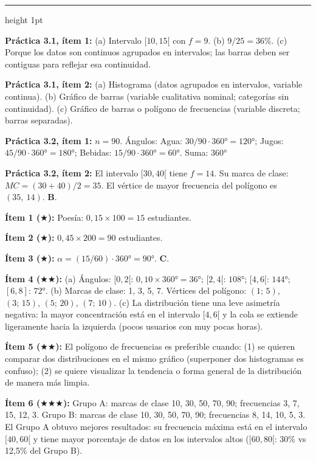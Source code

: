 \documentclass[11pt, letterpaper]{article}
\newcommand{\subbloque}[1]{%
  \vspace{14pt}
  \noindent{\large\bfseries\color{zenitnavy} #1}\par
  \vspace{4pt}\hrule height 1pt\vspace{8pt}}
\begin{document}
\subbloque{Sección 3 --- Gráficos estadísticos}

\textbf{Práctica 3.1, ítem 1:}
(a) Intervalo $[10,15[$ con $f=9$.
(b) $9/25=36\%$.
(c) Porque los datos son continuos agrupados en intervalos; las barras deben ser contiguas para reflejar esa continuidad.

\textbf{Práctica 3.1, ítem 2:}
(a) Histograma (datos agrupados en intervalos, variable continua).
(b) Gráfico de barras (variable cualitativa nominal; categorías sin continuidad).
(c) Gráfico de barras o polígono de frecuencias (variable discreta; barras separadas).

\textbf{Práctica 3.2, ítem 1:}
$n=90$. Ángulos: Agua: $30/90 \cdot 360°=120°$; Jugos: $45/90 \cdot 360°=180°$; Bebidas: $15/90 \cdot 360°=60°$. Suma: $360°$ \checkmark

\textbf{Práctica 3.2, ítem 2:}
El intervalo $[30,40[$ tiene $f=14$. Su marca de clase: $MC=(30+40)/2=35$. El vértice de mayor frecuencia del polígono es $(35,\ 14)$. \textbf{B}.

\textbf{Ítem 1 ($\bigstar$):} Poesía: $0{,}15\times100=15$ estudiantes.

\textbf{Ítem 2 ($\bigstar$):} $0{,}45\times200=90$ estudiantes.

\textbf{Ítem 3 ($\bigstar$):} $\alpha = (15/60)\cdot360°=90°$. \textbf{C}.

\textbf{Ítem 4 ($\bigstar\bigstar$):}
(a) Ángulos: $[0,2[$: $0{,}10\times360°=36°$; $[2,4[$: $108°$; $[4,6[$: $144°$; $[6,8]$: $72°$.
(b) Marcas de clase: 1, 3, 5, 7. Vértices del polígono: $(1;\,5)$, $(3;\,15)$, $(5;\,20)$, $(7;\,10)$.
(c) La distribución tiene una leve asimetría negativa: la mayor concentración está en el intervalo $[4,6[$ y la cola se extiende ligeramente hacia la izquierda (pocos usuarios con muy pocas horas).

\textbf{Ítem 5 ($\bigstar\bigstar$):} El polígono de frecuencias es preferible cuando: (1) se quieren comparar dos distribuciones en el mismo gráfico (superponer dos histogramas es confuso); (2) se quiere visualizar la tendencia o forma general de la distribución de manera más limpia.

\textbf{Ítem 6 ($\bigstar\bigstar\bigstar$):}
Grupo A: marcas de clase 10, 30, 50, 70, 90; frecuencias 3, 7, 15, 12, 3.
Grupo B: marcas de clase 10, 30, 50, 70, 90; frecuencias 8, 14, 10, 5, 3.
El Grupo A obtuvo mejores resultados: su frecuencia máxima está en el intervalo $[40,60[$ y tiene mayor porcentaje de datos en los intervalos altos ($[60,80[$: 30\% vs 12{,}5\% del Grupo B).
\end{document}
